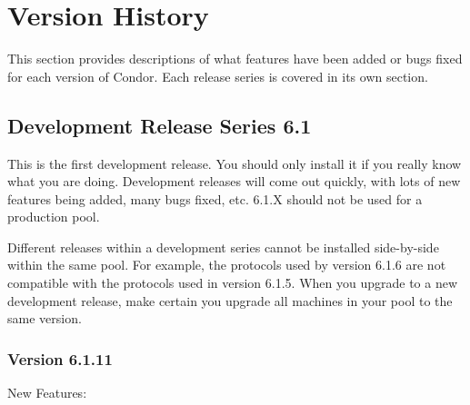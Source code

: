 \section{\label{sec:Version-History}Version History}

This section provides descriptions of what features have been added or
bugs fixed for each version of Condor.  
Each release series is covered in its own section.

\subsection{\label{sec:History-6-1}Development Release Series 6.1}

This is the first development release.
You should only install it if you really know what you are doing.
Development releases will come out quickly, with lots of new features
being added, many bugs fixed, etc.  
6.1.X should not be used for a production pool.

\Note Different releases within a development series cannot be
installed side-by-side within the same pool. 
For example, the protocols used by version 6.1.6 are not compatible with the
protocols used in version 6.1.5.  
When you upgrade to a new development release, make certain you upgrade all
machines in your pool to the same version.

\subsubsection{\label{sec:New-6-1-11}Version 6.1.11}

\noindent New Features:

